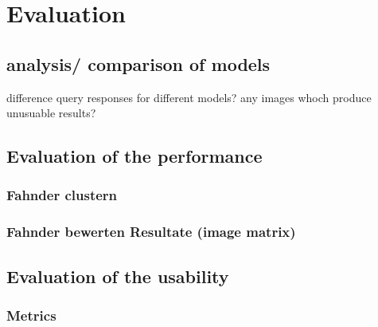 \chapter{Evaluation}\label{ch:evaluation}

\section{analysis/ comparison of models}\label{sec:evaluation-models}
difference query responses for different models?
any images whoch produce unusuable results?

\section{Evaluation of the performance}\label{sec:evaluation-performance}

\subsection{Fahnder clustern}\label{subsec:evaluation-metric1}

\subsection{Fahnder bewerten Resultate (image matrix)}\label{subsec:evaluation-metric2}

\section{Evaluation of the usability}\label{sec:evaluation-usability}

\subsection{Metrics}\label{subsec:evaluation-metrics}